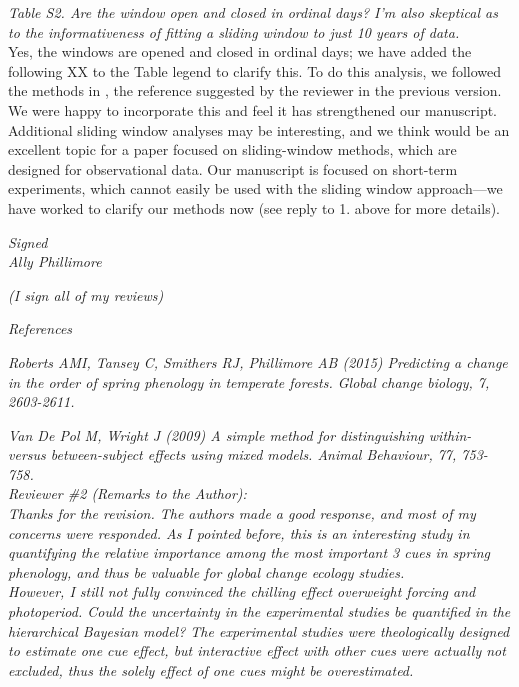 \documentclass[11pt, a4paper]{article}
\begin{document}
 \emph{Table S2. Are the window open and closed in ordinal days? I'm also skeptical as to the informativeness
of fitting a sliding window to just 10 years of data.}\\

Yes, the windows are opened and closed in ordinal days; we have added the following XX to the Table legend to clarify this. To do this analysis, we followed the methods in \citet{simmonds2019}, the reference suggested by the reviewer in the previous version. We were happy to incorporate this and feel it has strengthened our manuscript. Additional sliding window analyses may be interesting, and we think would be an excellent topic for a paper focused on sliding-window methods, which are designed for observational data. Our manuscript is focused on short-term experiments, which cannot easily be used with the sliding window approach---we have worked to clarify our methods now (see reply to 1. above for more details).

 \emph{Signed}\\
 \emph{Ally Phillimore}

 \emph{(I sign all of my reviews)}

 \emph{References}

\emph{Roberts AMI, Tansey C, Smithers RJ, Phillimore AB (2015) Predicting a change in the order of spring
phenology in temperate forests. Global change biology, 7, 2603-2611.}

 \emph{Van De Pol M, Wright J (2009) A simple method for distinguishing within- versus between-subject effects
using mixed models. Animal Behaviour, 77, 753-758.}\\

 \emph{Reviewer \#2 (Remarks to the Author):}\\

\emph{Thanks for the revision. The authors made a good response, and most of my concerns were responded. As I pointed before, this is an interesting study in quantifying the relative importance among the most important 3 cues in spring phenology, and thus be valuable for global change ecology studies. }\\


\emph{However, I still not fully convinced the chilling effect overweight forcing and photoperiod. Could the uncertainty in the experimental studies be quantified in the hierarchical Bayesian model? The experimental studies were theologically designed to estimate one cue effect, but interactive effect with other cues were actually not excluded, thus the solely effect of one cues might be overestimated.}\\ 
\end{document}
